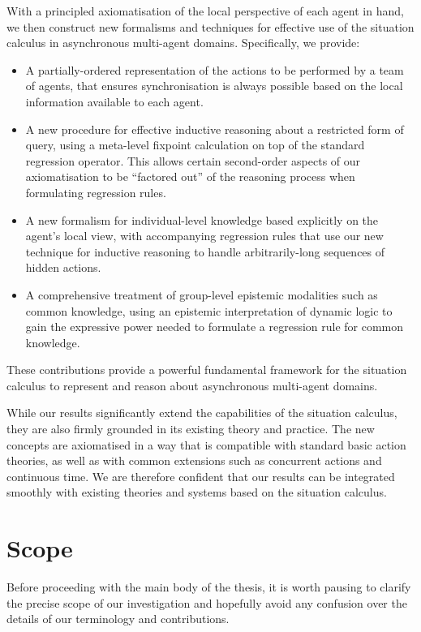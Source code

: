 With a principled axiomatisation of the local perspective of each
agent in hand, we then construct new formalisms and techniques for
effective use of the situation calculus in asynchronous multi-agent
domains. Specifically, we provide:
\begin{itemize}
\item A partially-ordered representation of the actions to be performed
by a team of agents, that ensures synchronisation is always possible
based on the local information available to each agent. 
\item A new procedure for effective inductive reasoning about a restricted
form of query, using a meta-level fixpoint calculation on top of the
standard regression operator. This allows certain second-order aspects
of our axiomatisation to be {}``factored out'' of the reasoning
process when formulating regression rules. 
\item A new formalism for individual-level knowledge based explicitly on
the agent's local view, with accompanying regression rules that use
our new technique for inductive reasoning to handle arbitrarily-long
sequences of hidden actions. 
\item A comprehensive treatment of group-level epistemic modalities such
as common knowledge, using an epistemic interpretation of dynamic
logic to gain the expressive power needed to formulate a regression
rule for common knowledge. 
\end{itemize}
These contributions provide a powerful fundamental framework for the
situation calculus to represent and reason about asynchronous multi-agent
domains.

While our results significantly extend the capabilities of the situation
calculus, they are also firmly grounded in its existing theory and
practice. The new concepts are axiomatised in a way that is compatible
with standard basic action theories, as well as with common extensions
such as concurrent actions and continuous time. We are therefore confident
that our results can be integrated smoothly with existing theories
and systems based on the situation calculus.


\section{Scope}

Before proceeding with the main body of the thesis, it is worth pausing
to clarify the precise scope of our investigation and hopefully avoid
any confusion over the details of our terminology and contributions.


